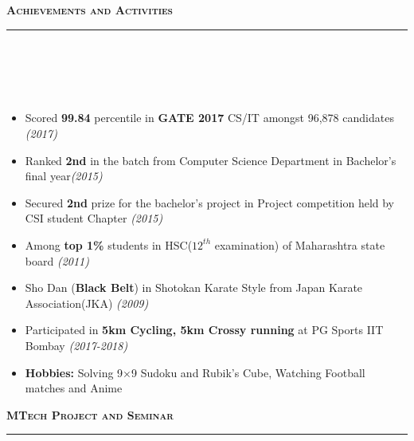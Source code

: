 \documentclass[a4paper,10pt]{article}
\newcommand{\isep}{-2 pt}
\newcommand{\lsep}{-0.5cm}
\newcommand{\resheading}[1]{{\small
        {
            \begin{minipage}
                {0.992\textwidth}\textbf{{\textsc{#1 \vphantom{p\^{E}} }}}
                \\[-0.3cm]
                \hrule
            \end{minipage}
            \\[-0.5cm]
        }
 }}
\begin{document}
\resheading{\textbf{\large Achievements and Activities}}\\[\lsep]
\\[-0.3cm]
\begin{itemize}\itemsep \isep
    \item \noindent Scored \textbf{99.84} percentile in \textbf{GATE 2017} CS/IT amongst 96,878 candidates \emph{\hfill  (2017)}
    \item Ranked \textbf{2nd} in the batch from Computer Science Department in Bachelor's final year\emph{\hfill  (2015)}
    \item Secured \textbf{2nd} prize for the bachelor's project in Project competition held by CSI student Chapter
    \emph{\hfill  (2015)}
    \item Among \textbf{top 1\%} students in HSC($12^{th}$ examination) of Maharashtra state board \emph{\hfill  (2011)}
    \item Sho Dan (\textbf{Black Belt}) in Shotokan Karate Style from Japan Karate Association(JKA) \emph{\hfill  (2009)}
    \item Participated in \textbf{5km Cycling, 5km Crossy running} at PG Sports IIT Bombay \emph{\hfill  (2017-2018)}
    \item \textbf{Hobbies:} Solving 9$\times$9 Sudoku and Rubik's Cube, Watching Football matches and Anime
\end{itemize}
\pagebreak
\resheading{\textbf{\large MTech Project and Seminar}}\\[\lsep] 
\\ [-0.3cm]
\end{document}
